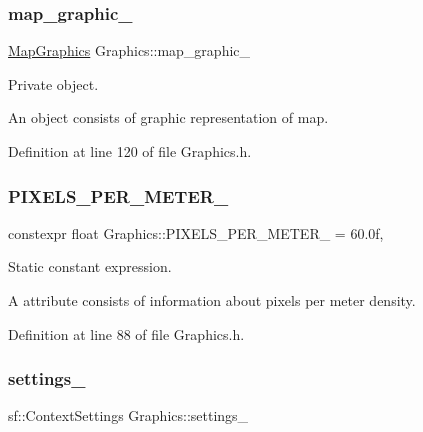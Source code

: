\subsubsection{\texorpdfstring{map\+\_\+graphic\+\_\+}{map\_graphic\_}}
{\footnotesize\ttfamily \hyperlink{classMapGraphics}{Map\+Graphics} Graphics\+::map\+\_\+graphic\+\_\+\hspace{0.3cm}{\ttfamily [private]}}



Private object. 

An object consists of graphic representation of map. 

Definition at line 120 of file Graphics.\+h.

\mbox{\label{classGraphics_af9c6251065c2900d0a92380c2bea26b2}} 
\subsubsection{\texorpdfstring{P\+I\+X\+E\+L\+S\+\_\+\+P\+E\+R\+\_\+\+M\+E\+T\+E\+R\+\_\+}{PIXELS\_PER\_METER\_}}
{\footnotesize\ttfamily constexpr float Graphics\+::\+P\+I\+X\+E\+L\+S\+\_\+\+P\+E\+R\+\_\+\+M\+E\+T\+E\+R\+\_\+ = 60.\+0f\hspace{0.3cm}{\ttfamily [static]}, {\ttfamily [private]}}



Static constant expression. 

A attribute consists of information about pixels per meter density. 

Definition at line 88 of file Graphics.\+h.

\mbox{\label{classGraphics_ab8d68b2977c39547e1c10a7669698aca}} 
\subsubsection{\texorpdfstring{settings\+\_\+}{settings\_}}
{\footnotesize\ttfamily sf\+::\+Context\+Settings Graphics\+::settings\+\_\+\hspace{0.3cm}{\ttfamily [private]}}



